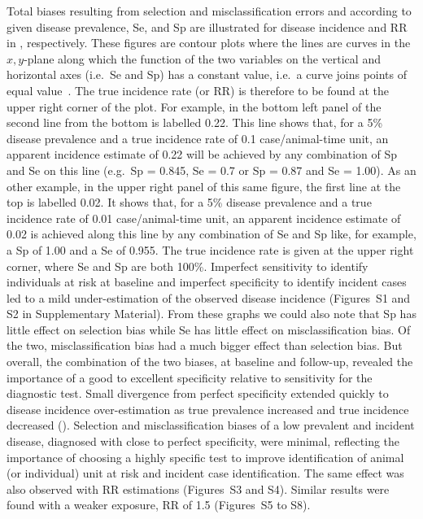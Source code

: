 Total biases resulting from selection and misclassification errors and according
to given disease prevalence, Se, and Sp are illustrated for disease incidence
and RR in , respectively.
These figures are contour plots where the lines are curves in the \(x, y\)-plane
along which the function of the two variables on the vertical and horizontal
axes (i.e.\ Se and Sp) has a constant value, i.e.\ a curve joins points of equal
value~\citep{courant_1996}.
The true incidence rate (or RR) is therefore to be found at the upper right
corner of the plot.
For example, in the bottom left panel of  the second
line from the bottom is labelled 0.22.
This line shows that, for a 5\% disease prevalence and a true incidence rate of
0.1 case/animal-time unit, an apparent incidence estimate of 0.22 will be
achieved by any combination of Sp and Se on this line (e.g.\ Sp = 0.845, Se =
0.7 or Sp = 0.87 and Se = 1.00).
As an other example, in the upper right panel of this same figure, the first
line at the top is labelled 0.02.
It shows that, for a 5\% disease prevalence and a true incidence rate of 0.01
case/animal-time unit, an apparent incidence estimate of 0.02 is achieved along
this line by any combination of Se and Sp like, for example, a Sp of 1.00 and a
Se of 0.955. The true incidence rate is given at the upper right corner, where
Se and Sp are both 100\%.
Imperfect sensitivity to identify individuals at risk at baseline and imperfect
specificity to identify incident cases led to a mild under-estimation of the
observed disease incidence (Figures~S1 and S2 in Supplementary Material).
From these graphs we could also note that Sp has little effect on selection bias
while Se has little effect on misclassification bias.
Of the two, misclassification bias had a much bigger effect than selection bias.
But overall, the combination of the two biases, at baseline and follow-up,
revealed the importance of a good to excellent specificity relative to
sensitivity for the diagnostic test.
Small divergence from perfect specificity extended quickly to disease incidence
over-estimation as true prevalence increased and true incidence decreased
().
Selection and misclassification biases of a low prevalent and incident disease,
diagnosed with close to perfect specificity, were minimal, reflecting the
importance of choosing a highly specific test to improve identification of
animal (or individual) unit at risk and incident case identification.
The same effect was also observed with RR estimations (Figures~S3 and S4).
Similar results were found with a weaker exposure, RR of 1.5 (Figures~S5 to S8).

